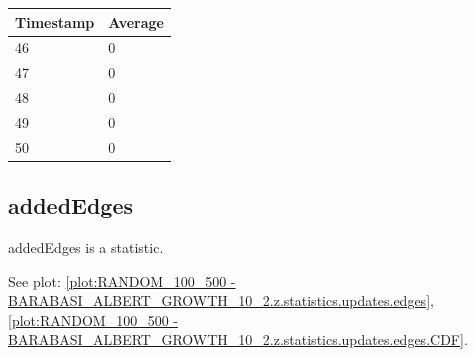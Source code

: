 \begin{tabular}{|l||l|}
\hline
	\textbf{Timestamp} & \textbf{Average} \\ \hline
	46 & 0 \\ \hline
	47 & 0 \\ \hline
	48 & 0 \\ \hline
	49 & 0 \\ \hline
	50 & 0 \\ \hline
\end{tabular}

\subsection{addedEdges}
addedEdges is a statistic.

See plot: \ref{plot:RANDOM_100_500 - BARABASI_ALBERT_GROWTH_10_2.z.statistics.updates.edges}, \ref{plot:RANDOM_100_500 - BARABASI_ALBERT_GROWTH_10_2.z.statistics.updates.edges.CDF}.

